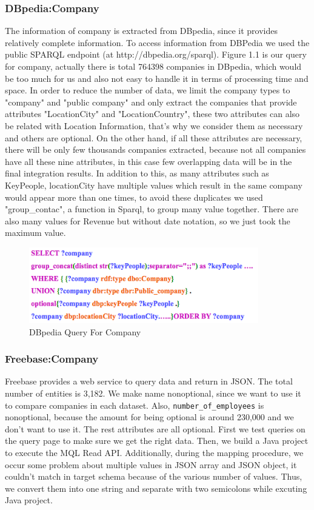 \subsubsection{DBpedia:Company}
The information of company is extracted from DBpedia, since it provides relatively complete information.  To access information from DBPedia we used the public SPARQL endpoint (at http://dbpedia.org/sparql). Figure 1.1 is our query for company, actually there is total 764398 companies in DBpedia, which would be too much for us and also not easy to handle it in terms of processing time and space. In order to reduce the number of data, we limit the company types to "company" and "public company" and only extract the companies that provide attributes "LocationCity" and "LocationCountry", these two attributes can also be related with Location Information, that's why we consider them as necessary and others are optional. On the other hand, if all these attributes are necessary, there will be only few thousands companies extracted, because not all companies have all these nine attributes, in this case few overlapping data will be in the final integration results. In addition to this, as many attributes such as KeyPeople, locationCity have multiple values which result in the same company would appear more than one times, to avoid these duplicates we used "group\_contac", a function in Sparql, to group many value together. There are also many values for Revenue but without date notation, so we just took the maximum value. 

\begin{figure}[H]
	\begin{center}
	\includegraphics[width=10cm]{DB_Com}
	\caption[DBpedia Query For Company]{DBpedia Query For Company}
	\label{fig:db}
	\end{center}
\end{figure}

\subsubsection{Freebase:Company}
Freebase provides a web service to query data and return in JSON. The total number of entities is 3,182. We make name nonoptional, since we want to use it to compare companies in each dataset. Also, \texttt{number\_of\_employees} is nonoptional, because the amount for being optional is around 230,000 and we don't want to use it. The rest attributes are all optional.
First we test queries on the query page to make sure we get the right data. Then, we build a Java project to execute the MQL Read API. Additionally, during the mapping procedure, we occur some problem about multiple values in JSON array and JSON object, it couldn't match in target schema because of the various number of values. Thus, we convert them into one string and separate with two semicolons while excuting Java project.

